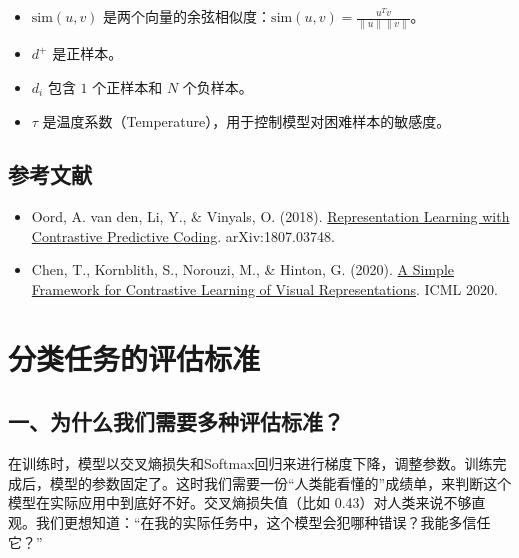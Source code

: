 \begin{itemize}
\tightlist
\item
  \(\mathrm{sim}(u,v)\) 是两个向量的余弦相似度：\(\mathrm{sim}(u,v)=\frac{u^Tv}{\lVert u\rVert\lVert v\rVert}\)。
\item
  \(d^+\) 是正样本。
\item
  \(d_i\) 包含 \(1\) 个正样本和 \(N\) 个负样本。
\item
  \(\tau\) 是温度系数（Temperature），用于控制模型对困难样本的敏感度。
\end{itemize}

\hypertarget{ux53c2ux8003ux6587ux732e-30}{%
\subsection{参考文献}\label{ux53c2ux8003ux6587ux732e-30}}

\begin{itemize}
\tightlist
\item
  Oord, A. van den, Li, Y., \& Vinyals, O. (2018). \href{https://arxiv.org/abs/1807.03748}{Representation Learning with Contrastive Predictive Coding}. arXiv:1807.03748.
\item
  Chen, T., Kornblith, S., Norouzi, M., \& Hinton, G. (2020). \href{https://proceedings.mlr.press/v119/chen20j.html}{A Simple Framework for Contrastive Learning of Visual Representations}. ICML 2020.
\end{itemize}

\clearpage

\hypertarget{ux5206ux7c7bux4efbux52a1ux7684ux8bc4ux4f30ux6807ux51c6}{%
\section{分类任务的评估标准}\label{ux5206ux7c7bux4efbux52a1ux7684ux8bc4ux4f30ux6807ux51c6}}

\hypertarget{ux4e00ux4e3aux4ec0ux4e48ux6211ux4eecux9700ux8981ux591aux79cdux8bc4ux4f30ux6807ux51c6}{%
\subsection{一、为什么我们需要多种评估标准？}\label{ux4e00ux4e3aux4ec0ux4e48ux6211ux4eecux9700ux8981ux591aux79cdux8bc4ux4f30ux6807ux51c6}}

在训练时，模型以交叉熵损失和Softmax回归来进行梯度下降，调整参数。训练完成后，模型的参数固定了。这时我们需要一份``人类能看懂的''成绩单，来判断这个模型在实际应用中到底好不好。交叉熵损失值（比如 0.43）对人类来说不够直观。我们更想知道：``在我的实际任务中，这个模型会犯哪种错误？我能多信任它？''

